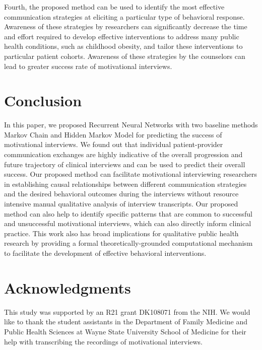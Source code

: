 \documentclass{amia_summit_2018}
\begin{document}
Fourth, the proposed method can be used to identify the most effective communication strategies at eliciting a particular type of behavioral response. Awareness of these strategies by researchers can significantly decrease the time and effort required to develop effective interventions to address many public health conditions, such as childhood obesity, and tailor these interventions to particular patient cohorts. Awareness of these strategies by the counselors can lead to greater success rate of motivational interviews.     
 
\section*{Conclusion}
In this paper, we proposed Recurrent Neural Networks with two baseline methods Markov Chain and Hidden Markov Model for predicting the success of motivational interviews. We found out that individual patient-provider communication exchanges are highly indicative of the overall progression and future trajectory of clinical interviews and can be used to predict their overall success. Our proposed method can facilitate motivational interviewing researchers in establishing causal relationships between different communication strategies and the desired behavioral outcomes during the interviews without resource intensive manual qualitative analysis of interview transcripts. Our proposed method can also help to identify specific patterns that are common to successful and unsuccessful motivational interviews, which can also directly inform clinical practice. This work also has broad implications for qualitative public health research by providing a formal theoretically-grounded computational mechanism to facilitate the development of effective behavioral interventions.


\section*{Acknowledgments}
This study was supported by an R21 grant DK108071 from the NIH. We would like to thank the student assistants in the Department of Family Medicine and Public Health Sciences at Wayne State University School of Medicine for their help with transcribing the recordings of motivational interviews. 
\pagebreak



\end{document}
